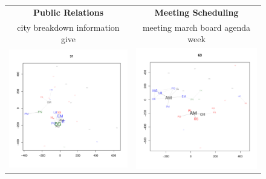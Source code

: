 \begin{figure}[t]
\begin{minipage}[b]{0.5\linewidth}
\begin{tabular}{cc}
{\bf Public Relations} &
{\bf Meeting Scheduling} \\
{\small city breakdown information give} &
{\small meeting march board agenda week} \\
\includegraphics[scale=.29, trim=.4in .6in .4in .8in, clip=true]{latent_space_31} &
 \includegraphics[scale=.29, trim=.4in .6in .4in .8in, clip=true]{latent_space_63} \\

\end{tabular}
\end{minipage}
\end{figure}
